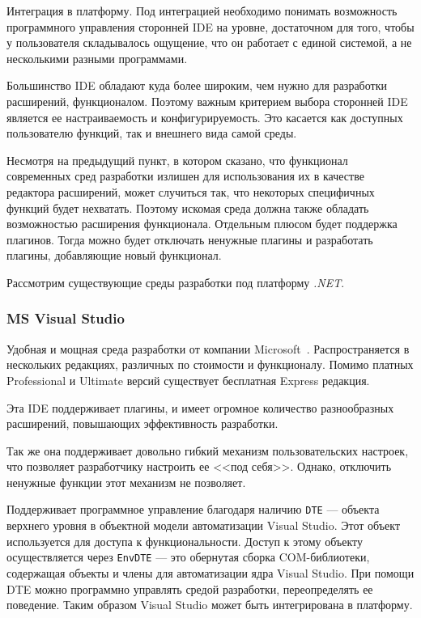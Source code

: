 Интеграция в платформу. Под интеграцией необходимо понимать возможность программного управления сторонней IDE на уровне, достаточном для того, чтобы у пользователя складывалось ощущение, что он работает с единой системой, а не несколькими разными программами.

Большинство IDE обладают куда более широким, чем нужно для разработки расширений, функционалом. Поэтому важным критерием выбора сторонней IDE является ее настраиваемость и конфигурируемость. Это касается как доступных пользователю функций, так и внешнего вида самой среды.

Несмотря на предыдущий пункт, в котором сказано, что функционал современных сред разработки излишен для использования их в качестве редактора расширений, может случиться так, что некоторых специфичных функций будет нехватать. Поэтому искомая среда должна также обладать возможностью расширения функционала. Отдельным плюсом будет поддержка плагинов. Тогда можно будет отключать ненужные плагины и разработать плагины, добавляющие новый функционал.

Рассмотрим существующие среды разработки под платформу {\it .NET}.

\subsubsection{MS Visual Studio}

Удобная и мощная среда разработки от компании Microsoft~\cite{vs-website}. Распространяется в нескольких редакциях, различных по стоимости и функционалу. Помимо платных Professional и Ultimate версий существует бесплатная Express редакция.

Эта IDE поддерживает плагины, и имеет огромное количество разнообразных расширений, повышающих эффективность разработки.

Так же она поддерживает довольно гибкий механизм пользовательских настроек, что позволяет разработчику настроить ее <<под себя>>. Однако, отключить ненужные функции этот механизм не позволяет.

Поддерживает программное управление благодаря наличию  {\tt DTE} --- объекта верхнего уровня в объектной модели автоматизации Visual Studio. Этот объект используется для доступа к функциональности. Доступ к этому объекту осуществляется через {\tt EnvDTE} --- это обернутая сборка COM-библиотеки, содержащая объекты и члены для автоматизации ядра Visual Studio. При помощи DTE можно программно управлять средой разработки, переопределять ее поведение. Таким образом Visual Studio может быть интегрирована в платформу.

